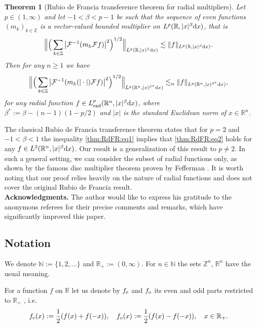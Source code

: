 \documentclass[11pt,oneside]{amsart}
\numberwithin{equation}{section}
\newtheorem{theorem}[equation]{Theorem}
\theoremstyle{definition}
\newcommand{\NN}{\mathbb{N}}
\newcommand{\RR}{\mathbb{R}}
\newcommand{\ZZ}{\mathbb{Z}}
\newcommand{\calF}{\mathcal{F}}
\begin{document}
\begin{theorem}[Rubio de Francia transference theorem for radial multipliers]\label{thm:RdFR}
Let $p\in(1,\infty)$ and let $-1<\beta<p-1$ be such that the sequence of even functions $(m_k)_{k\in\ZZ}$ is a vector-valued bounded multiplier on  $L^p(\RR,|x|^\beta {\rm d}x)$, that is
\begin{equation}\label{thm:RdFR:eq1}
    \Big\|\Big(\sum_{k\in\ZZ}\big|\calF^{-1}(m_k\calF f)\big|^2\Big)^{1/2}\Big\|_{L^p(\RR,|x|^\beta{\rm d}x)}\lesssim\|f\|_{L^p(\RR,|x|^\beta {\rm d}x)}.
\end{equation}
Then for any $n\geq 1$ we have
\begin{equation}\label{thm:RdFR:eq2}
    \Big\|\Big(\sum_{k\in\ZZ}\big|\calF^{-1}(m_k(|\cdot|)\calF f)\big|^2\Big)^{1/2}\Big\|_{L^p(\RR^n,|x|^{\beta^*}{\rm d}x)}\lesssim_{n}\|f\|_{L^p(\RR^n,|x|^{\beta^*} {\rm d}x)},
\end{equation}
for any radial function $f\in L_{\rm rad}^p(\RR^n,|x|^\beta{\rm d}x)$, where $\beta^*:=\beta-(n-1)(1-p/2)$ and $|x|$ is the standard Euclidean norm of $x\in\RR^n$.
\end{theorem}
The classical Rubio de Francia transference theorem \cite[Theorem 2.1]{RdF2} states that for $p=2$ and $-1<\beta<1$ the inequality \eqref{thm:RdFR:eq1} implies that \eqref{thm:RdFR:eq2} holds for any $f\in L^2(\RR^n,|x|^{\beta} {\rm d}x)$. Our result is a generalization of this result to $p\neq 2$. In such a general setting, we can consider the subset of radial functions only, as shown by the famous disc multiplier theorem proven by Fefferman \cite{Fefferman1971}. It is worth noting that our proof relies heavily on the nature of radial functions and does not cover the original Rubio de Francia result.\\
\textbf{Acknowledgments.}
    The author would like to express his gratitude to the anonymous referees for their precise comments and remarks, which have significantly improved this paper.

\subsection{Notation}\label{sec:notation}
We denote $\NN:=\{1, 2, \ldots\}$ and $\RR_+:=(0, \infty)$. For $n\in\NN$ the sets $\ZZ^n$, $\RR^n$ have the usual meaning. 

For a function $f$ on $\RR$ let us denote by $f_{\rm e}$ and $f_{\rm o}$ its even and odd parts restricted to $\RR_+$ , i.e.
\begin{equation*}
	    f_{\rm e}(x):=\frac12(f(x)+f(-x)), \quad f_{\rm o}(x):=\frac12(f(x)-f(-x)), \quad x\in\RR_+.
\end{equation*}
\end{document}
